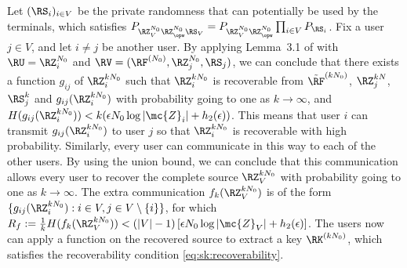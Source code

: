 Let  $(\RS_i)_{i \in V}$ be the private randomness that can potentially be used by the terminals, which satisfies $P_{\RZ^{N_0}_V\RZ_{\opw}^{N_0}\RS_V}=P_{\RZ^{N_0}_V\RZ_{\opw}^{N_0}}\prod_{i \in V}P_{\RS_i}$. Fix a user $j \in  V$, and let $i \neq j$ be another user. By applying Lemma~3.1 of \cite{csiszar08} with $\RU=\RZ_i^{N_0}$ and $\RV=({\RF}^{(N_0)}, \RZ_j^{N_0}, \RS_j)$, we can conclude that there exists a function $g_{ij}$ of $\RZ_i^{kN_0}$ such that $\RZ_i^{kN_0}$ is recoverable from $\tilde{\RF}^{(kN_0)}$, $\RZ_j^{kN}$, $\RS^k_j$ and $g_{ij}(\RZ_i^{kN_0})$ with probability going to one as $k \to \infty$, and $H(g_{ij}(\RZ_i^{kN_0}))< k(\epsilon N_0 \log|\mc{Z}_i|+ h_2(\epsilon))$. This means that user $i$ can transmit $g_{ij}(\RZ_i^{kN_0})$ to user $j$ so that $\RZ_i^{kN_0}$ is recoverable with high probability. Similarly, every user can communicate in this way to each of the other users. By using the union bound, we can conclude that this communication allows every user to recover the complete source $\RZ_V^{kN_0}$ with probability going to one as $k \to \infty$. The extra communication $f_k(\RZ_V^{kN_0})$ is of the form $\{g_{ij}(\RZ_i^{kN_0}):i \in V, j \in  V\setminus \{i\}\}$, for which $R_f:=\frac{1}{k}H(f_k(\RZ_V^{kN_0})) <(|V|-1)\left[\epsilon N_0 \log|\mc{Z}_V|+h_2(\epsilon)\right]$.  The users now can apply a function on the recovered source to extract a key $\RK^{(kN_0)}$, which satisfies the recoverability condition \eqref{eq:sk:recoverability}.

